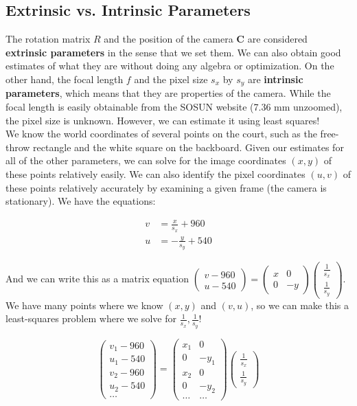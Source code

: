 \documentclass{article}
\begin{document}
\subsection{Extrinsic vs. Intrinsic Parameters}
The rotation matrix $R$ and the position of the camera $\bm{C}$ are considered \textbf{extrinsic parameters} in the sense that we set them. We can also obtain good estimates of what they are without doing any algebra or optimization. On the other hand, the focal length $f$ and the pixel size $s_{x}$ by $s_{y}$ are \textbf{intrinsic parameters}, which means that they are properties of the camera. While the focal length is easily obtainable from the SOSUN website (7.36 mm unzoomed), the pixel size is unknown. However, we can estimate it using least squares! \\

We know the world coordinates of several points on the court, such as the free-throw rectangle and the white square on the backboard. Given our estimates for all of the other parameters, we can solve for the image coordinates $(x, y)$ of these points relatively easily. We can also identify the pixel coordinates $(u, v)$ of these points relatively accurately by examining a given frame (the camera is stationary). We have the equations:

\begin{align*}
v&=\frac{x}{s_{x}}+960 \\
u&=-\frac{y}{s_{y}}+540
\end{align*}

And we can write this as a matrix equation $\begin{pmatrix} v-960 \\ u-540 \end{pmatrix}=\begin{pmatrix} x & 0 \\ 0 & -y \end{pmatrix}\begin{pmatrix} \frac{1}{s_x} \\ \frac{1}{s_y} \end{pmatrix}$. We have many points where we know $(x, y)$ and $(v, u)$, so we can make this a least-squares problem where we solve for $\frac{1}{s_x}, \frac{1}{s_y}$!

\[\begin{pmatrix} v_1-960 \\ u_1-540 \\ v_2-960 \\ u_2-540 \\ \hdots \end{pmatrix}=\begin{pmatrix} x_1 & 0 \\ 0 & -y_1 \\ x_2 & 0 \\ 0 & -y_2 \\ \hdots & \hdots \end{pmatrix}\begin{pmatrix} \frac{1}{s_x} \\ \frac{1}{s_y} \end{pmatrix}\]
\end{document}
